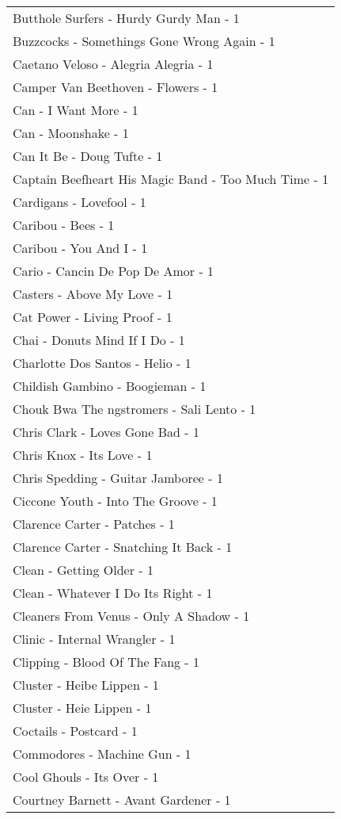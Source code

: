\documentclass[
]{article}
\begin{document}
\begin{longtable}{l}
Butthole Surfers - Hurdy Gurdy Man - 1 \\ 
Buzzcocks - Somethings Gone Wrong Again - 1 \\ 
Caetano Veloso - Alegria Alegria - 1 \\ 
Camper Van Beethoven - Flowers - 1 \\ 
Can - I Want More - 1 \\ 
Can - Moonshake - 1 \\ 
Can It Be - Doug Tufte - 1 \\ 
Captain Beefheart His Magic Band - Too Much Time - 1 \\ 
Cardigans - Lovefool - 1 \\ 
Caribou - Bees - 1 \\ 
Caribou - You And I - 1 \\ 
Cario - Cancin De Pop De Amor - 1 \\ 
Casters - Above My Love - 1 \\ 
Cat Power - Living Proof - 1 \\ 
Chai - Donuts Mind If I Do - 1 \\ 
Charlotte Dos Santos - Helio - 1 \\ 
Childish Gambino - Boogieman - 1 \\ 
Chouk Bwa The ngstromers - Sali Lento - 1 \\ 
Chris Clark - Loves Gone Bad - 1 \\ 
Chris Knox - Its Love - 1 \\ 
Chris Spedding - Guitar Jamboree - 1 \\ 
Ciccone Youth - Into The Groove - 1 \\ 
Clarence Carter - Patches - 1 \\ 
Clarence Carter - Snatching It Back - 1 \\ 
Clean - Getting Older - 1 \\ 
Clean - Whatever I Do Its Right - 1 \\ 
Cleaners From Venus - Only A Shadow - 1 \\ 
Clinic - Internal Wrangler - 1 \\ 
Clipping - Blood Of The Fang - 1 \\ 
Cluster - Heibe Lippen - 1 \\ 
Cluster - Heie Lippen - 1 \\ 
Coctails - Postcard - 1 \\ 
Commodores - Machine Gun - 1 \\ 
Cool Ghouls - Its Over - 1 \\ 
Courtney Barnett - Avant Gardener - 1 \\ 

\end{longtable}
\end{document}
